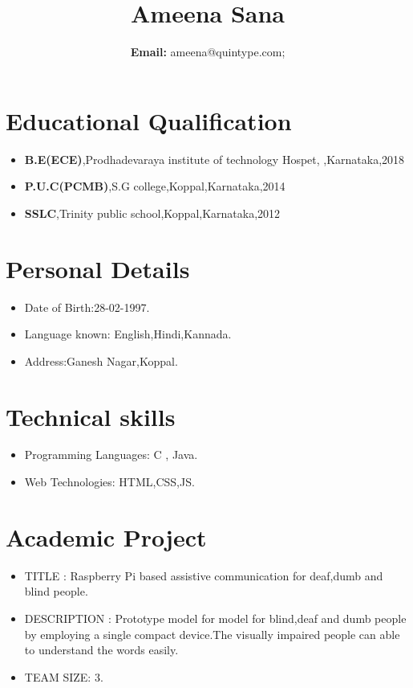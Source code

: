 \documentclass[11pt,oneside,a4paper]{article}
\begin{document}
	\title{\bf Ameena Sana}
	
	\author{ {\bf Email:} {ameena@quintype.com;}}
	\date{}
	
	
	
	\maketitle
	
	\section*{Educational Qualification}
	\begin{itemize}
		
		\item {\bf B.E(ECE)},Prodhadevaraya institute of technology Hospet, 
		 ,Karnataka,2018
		
		\item 
		{\bf P.U.C(PCMB)},S.G college,Koppal,Karnataka,2014
		
		\item  {\bf SSLC},Trinity public school,Koppal,Karnataka,2012
		
	\end{itemize}
	
	
	\section*{Personal Details}
	
	\begin{itemize}
		\item Date of Birth:28-02-1997.
		\item Language known: English,Hindi,Kannada.
		\item Address:Ganesh Nagar,Koppal.
		
	\end{itemize}
	
	\section*{Technical skills}
	\begin{itemize}
		
	\item Programming Languages: C , Java.
	\item Web Technologies: HTML,CSS,JS.
	
	\end{itemize}

\section{Academic Project}
\begin{itemize}
	
	\item TITLE : Raspberry Pi based assistive communication for deaf,dumb and blind people.
	\item DESCRIPTION : Prototype model for model for blind,deaf and dumb people by employing a single compact device.The visually impaired people can able to understand the words easily.
	\item TEAM SIZE: 3.
	\end{itemize}
	
\end{document}
